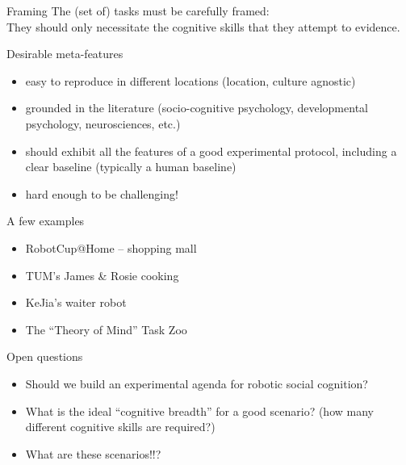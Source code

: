 \documentclass[compress]{beamer}
\begin{document}
\begin{frame}{Framing}
    The (set of) tasks must be {\Medium carefully framed}:\\

    They should {\Medium only necessitate the cognitive skills that they
    attempt to evidence}.

\end{frame}

\begin{frame}{Desirable meta-features}

    \begin{itemize}
        \item easy to reproduce in different locations (location, culture
            agnostic)
        \item grounded in the literature (socio-cognitive psychology, developmental
            psychology, neurosciences, etc.)
        \item should exhibit all the features of a good experimental protocol,
            including a clear baseline (typically a human baseline)
        \item hard enough to be challenging!
    \end{itemize}
\end{frame}

\begin{frame}{A few examples}
    \begin{itemize}
        \item<1-> RobotCup@Home -- shopping mall
        \item<2-> TUM's James \& Rosie cooking
        \item<3-> KeJia's waiter robot
        \item<4-> The ``Theory of Mind'' Task Zoo
    \end{itemize}

    \centering
    \end{frame}

\begin{frame}{Open questions}

    \begin{itemize}
        \item Should we build an experimental agenda for robotic social cognition?
        \item What is the ideal ``cognitive breadth'' for a good scenario? (how many
            different cognitive skills are required?)
        \item What are these scenarios!!?
    \end{itemize}
\end{frame}
\end{document}
